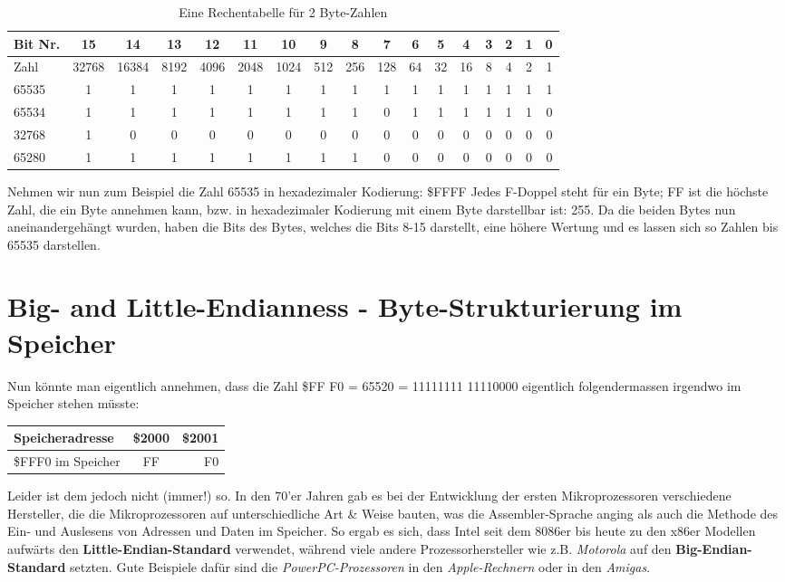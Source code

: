 \documentclass[a4paper,10pt,dvips,fleqn,titlepage,twoside]{book}
\begin{document}
\oddsidemargin -0.6in
\begin{table}[h]
\caption{Eine Rechentabelle für 2 Byte-Zahlen}
\begin{tabular}{|l|c|c|c|c|c|c|c|c|c|c|c|c|c|c|c|r|}\hline
Bit Nr. & 15 & 14 & 13 & 12 & 11 & 10 & 9 & 8 & 7 & 6 & 5 & 4 & 3 & 2 & 1 & 0\\\hline
Zahl & 32768 & 16384 & 8192 & 4096 & 2048 & 1024 & 512 & 256 & 128 & 64 & 32 & 16 & 8 & 4 & 2 & 1\\\hline\hline
65535  & 1 & 1 & 1 & 1 & 1 & 1 & 1 & 1 & 1 & 1 & 1 & 1 & 1 & 1 & 1 & 1\\\hline
65534 &1 & 1 & 1 & 1 & 1 & 1 & 1 & 1 & 0 & 1 & 1 & 1 & 1 & 1 & 1 & 0\\\hline
32768 & 1 & 0 & 0 & 0 & 0 & 0 & 0 & 0 & 0 & 0 & 0 & 0 & 0 & 0 & 0 & 0\\\hline
65280 & 1 & 1 & 1 & 1 & 1 & 1 & 1 & 1 & 0 & 0 & 0 & 0 & 0 & 0 & 0 & 0\\\hline
\end{tabular}
\end{table}

Nehmen wir nun zum Beispiel die Zahl 65535 in hexadezimaler Kodierung: \$FFFF
Jedes F-Doppel steht für ein Byte; FF ist die höchste Zahl, die ein Byte annehmen kann, bzw. in hexadezimaler Kodierung mit einem Byte darstellbar ist: 255. Da die beiden Bytes nun aneinandergehängt wurden, haben die Bits des Bytes, welches die Bits 8-15 darstellt, eine höhere Wertung und es lassen sich so Zahlen bis 65535 darstellen.
\newpage
\section{Big- and Little-Endianness - Byte-Strukturierung im Speicher}
Nun könnte man eigentlich annehmen, dass die Zahl \$FF F0 = 65520 = 11111111 11110000 eigentlich folgendermassen irgendwo im Speicher stehen müsste:\newline
\begin{center}
\begin{tabular}{|l|c|r|}\hline
Speicheradresse & \$2000 & \$2001 \\\hline
\$FFF0 im Speicher & FF & F0\\\hline
\end{tabular}
\end{center}


Leider ist dem jedoch nicht (immer!) so. In den 70'er Jahren gab es bei der Entwicklung der ersten Mikroprozessoren verschiedene Hersteller, die die Mikroprozessoren auf unterschiedliche Art \& Weise bauten, was die Assembler-Sprache anging als auch die Methode des Ein- und Auslesens von Adressen und Daten im Speicher.\newline
So ergab es sich, dass Intel seit dem 8086er bis heute zu den x86er Modellen aufwärts den \textbf{Little-Endian-Standard} verwendet, während viele andere Prozessorhersteller wie z.B. \emph{Motorola} auf den \textbf{Big-Endian-Standard} setzten. Gute Beispiele dafür sind die \emph{PowerPC-Prozessoren} in den \emph{Apple-Rechnern} oder in den \emph{Amigas}.
\end{document}

